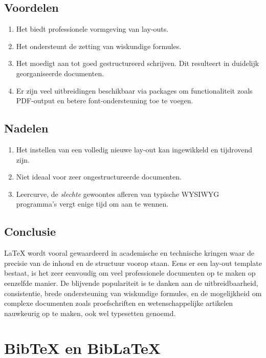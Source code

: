 \subsection{Voordelen}
\begin{enumerate}
    \item Het biedt professionele vormgeving van lay-outs.
    \item Het ondersteunt de zetting van wiskundige formules.
    \item Het moedigt aan tot goed gestructureerd schrijven. Dit resulteert in duidelijk georganiseerde documenten.
    \item Er zijn veel uitbreidingen beschikbaar via packages om functionaliteit zoals PDF-output en betere font-ondersteuning toe te voegen.
\end{enumerate}

\subsection{Nadelen}
\begin{enumerate}
    \item Het instellen van een volledig nieuwe lay-out kan ingewikkeld en tijdrovend zijn.
    \item Niet ideaal voor zeer ongestructureerde documenten.
    \item Leercurve, de \emph{slechte} gewoontes afleren van typische WYSIWYG programma's vergt enige tijd om aan te wennen.
\end{enumerate}

\subsection{Conclusie}
\LaTeX{} \autocite{Oetiker2023} wordt vooral gewaardeerd in academische en technische kringen waar de precisie van de inhoud en de structuur voorop staan. Eens er een lay-out template bestaat, is het zeer eenvoudig om veel professionele documenten op te maken op eenzelfde manier. De blijvende populariteit is te danken aan de uitbreidbaarheid, consistentie, brede ondersteuning van wiskundige formules, en de mogelijkheid om complexe documenten zoals proefschriften en wetenschappelijke artikelen nauwkeurig op te maken, ook wel typesetten genoemd.


\section{BibTeX en BibLaTeX}

